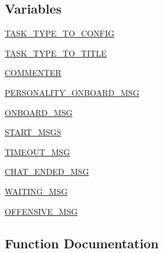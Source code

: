 \subsection*{Variables}
\begin{DoxyCompactItemize}
\item 
\hyperlink{namespacepersonality__captions_1_1worlds_a6390182c27ac332ffa5a81a786c59641}{T\+A\+S\+K\+\_\+\+T\+Y\+P\+E\+\_\+\+T\+O\+\_\+\+C\+O\+N\+F\+IG}
\item 
\hyperlink{namespacepersonality__captions_1_1worlds_a64970db3fa51f7ff90fdc47779b482c4}{T\+A\+S\+K\+\_\+\+T\+Y\+P\+E\+\_\+\+T\+O\+\_\+\+T\+I\+T\+LE}
\item 
\hyperlink{namespacepersonality__captions_1_1worlds_a99bd89bff3bd5eff96f3dbb924374496}{C\+O\+M\+M\+E\+N\+T\+ER}
\item 
\hyperlink{namespacepersonality__captions_1_1worlds_a13a16fae4f27e9c076ba24b136240668}{P\+E\+R\+S\+O\+N\+A\+L\+I\+T\+Y\+\_\+\+O\+N\+B\+O\+A\+R\+D\+\_\+\+M\+SG}
\item 
\hyperlink{namespacepersonality__captions_1_1worlds_abd2e5817652a0f220517d7a797ea8125}{O\+N\+B\+O\+A\+R\+D\+\_\+\+M\+SG}
\item 
\hyperlink{namespacepersonality__captions_1_1worlds_a62773bb4fcca14035a76613ad79aaa30}{S\+T\+A\+R\+T\+\_\+\+M\+S\+GS}
\item 
\hyperlink{namespacepersonality__captions_1_1worlds_a9f1e6c28d764349171df61ad8a8086c3}{T\+I\+M\+E\+O\+U\+T\+\_\+\+M\+SG}
\item 
\hyperlink{namespacepersonality__captions_1_1worlds_ab5f20ce3940daeff015b65b3685165ed}{C\+H\+A\+T\+\_\+\+E\+N\+D\+E\+D\+\_\+\+M\+SG}
\item 
\hyperlink{namespacepersonality__captions_1_1worlds_a1c9e7ea5c14a1b038e80a9bc2a66f6b1}{W\+A\+I\+T\+I\+N\+G\+\_\+\+M\+SG}
\item 
\hyperlink{namespacepersonality__captions_1_1worlds_a25e8ccb5952ed2f6b6a180b425a58db0}{O\+F\+F\+E\+N\+S\+I\+V\+E\+\_\+\+M\+SG}
\end{DoxyCompactItemize}


\subsection{Function Documentation}
\mbox{\label{namespacepersonality__captions_1_1worlds_a2863737d97a8e8c5a1ebe9029d0d2293}} 
